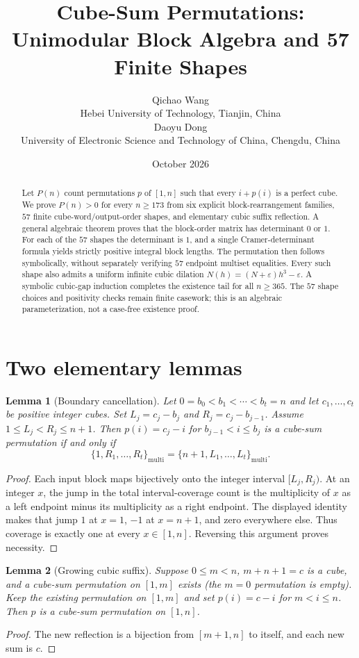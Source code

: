 \documentclass[10pt]{article}
\title{Cube-Sum Permutations: Unimodular Block Algebra and 57 Finite Shapes}
\author{Qichao Wang\\{\small Hebei University of Technology, Tianjin, China}\\[0.4em]Daoyu Dong\\{\small University of Electronic Science and Technology of China, Chengdu, China}}
\date{October 2026}
\newtheorem{lemma}{Lemma}
\begin{document}
\maketitle

\begin{abstract}
Let $P(n)$ count permutations $p$ of $[1,n]$
such that every $i+p(i)$ is a perfect cube.
We prove $P(n)>0$ for every $n\ge173$
from six explicit block-rearrangement families,
$57$ finite cube-word/output-order shapes, and
elementary cubic suffix reflection.
A general algebraic theorem proves that the
block-order matrix has determinant $0$ or $1$.
For each of the $57$ shapes the determinant is $1$,
and a single Cramer-determinant formula yields
strictly positive integral block lengths.
The permutation then follows symbolically,
without separately verifying $57$ endpoint
multiset equalities. Every such shape also admits
a uniform infinite cubic dilation
$N(h)=(N+\varepsilon)h^3-\varepsilon$.
A symbolic cubic-gap induction completes
the existence tail for all $n\ge365$.
The $57$ shape choices and positivity checks
remain finite casework; this is an algebraic
parameterization, not a case-free existence proof.
\end{abstract}

\section{Two elementary lemmas}

\begin{lemma}[Boundary cancellation]\label{lem:balance}
Let $0=b_0<b_1<\cdots<b_t=n$ and let
$c_1,\ldots,c_t$ be positive integer cubes.
Set $L_j=c_j-b_j$ and $R_j=c_j-b_{j-1}$.
Assume $1\le L_j<R_j\le n+1$.
Then $p(i)=c_j-i$ for $b_{j-1}<i\le b_j$
is a cube-sum permutation if and only if
\[
\boxed{\{1,R_1,\ldots,R_t\}_{\mathrm{multi}}
 =\{n+1,L_1,\ldots,L_t\}_{\mathrm{multi}}.}
\]
\end{lemma}
\begin{proof}
Each input block maps bijectively onto the integer
interval $[L_j,R_j)$. At an integer $x$, the jump
in the total interval-coverage count is the
multiplicity of $x$ as a left endpoint minus
its multiplicity as a right endpoint.
The displayed identity makes that jump $1$
at $x=1$, $-1$ at $x=n+1$, and zero everywhere
else. Thus coverage is exactly one at
every $x\in[1,n]$. Reversing this argument
proves necessity.
\end{proof}

\begin{lemma}[Growing cubic suffix]\label{lem:suffix}
Suppose $0\le m<n$, $m+n+1=c$ is a cube,
and a cube-sum permutation on $[1,m]$ exists
(the $m=0$ permutation is empty).
Keep the existing permutation on $[1,m]$
and set $p(i)=c-i$ for $m<i\le n$.
Then $p$ is a cube-sum permutation on $[1,n]$.
\end{lemma}
\begin{proof}
The new reflection is a bijection from
$[m+1,n]$ to itself, and each new sum is $c$.
\end{proof}
\end{document}
